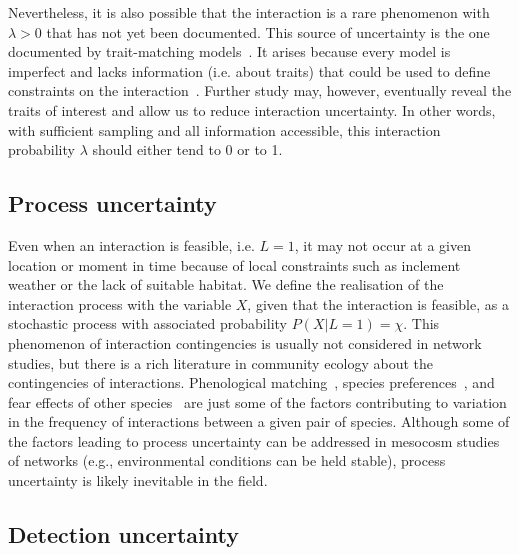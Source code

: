 \documentclass[12pt]{article}
\begin{document}
\begin{spacing}{2.0}
      Nevertheless, it is also possible that the interaction is a rare phenomenon with $\lambda>0$ that has not yet been documented. This source of uncertainty is the one documented by trait-matching models~\citep{Bartomeus2016}. It arises because every model is imperfect and lacks information (i.e. about traits) that could be used to define constraints on the interaction~\citep{Dormann2017}. Further study may, however, eventually reveal the traits of interest and allow us to reduce interaction uncertainty. In other words, with sufficient sampling and all information accessible, this interaction probability $\lambda$ should either tend to 0 or to 1. 

    \subsection*{Process uncertainty} 

     Even when an interaction is feasible, i.e. $L=1$, it may not occur at a given location or moment in time because of local constraints such as inclement weather or the lack of suitable habitat. We define the realisation of the interaction process with the variable $X$, given that the interaction is feasible, as a stochastic process with associated probability $P(X|L=1)=\chi$. This phenomenon of interaction contingencies is usually not considered in network studies, but there is a rich literature in community ecology about the contingencies of interactions. Phenological matching~\citep{MillerRushing2010,Gezon2016}, species preferences~\citep{Pires2011,Novak2015,Coux2016}, and fear effects of other species~\citep{Luttbeg2005,Wirsing2008} are just some of the factors contributing to variation in the frequency of interactions between a given pair of species. Although some of the factors leading to process uncertainty can be addressed in mesocosm studies of networks (e.g., environmental conditions can be held stable), process uncertainty is likely inevitable in the field. 

    \subsection*{Detection uncertainty} 


\end{spacing}
\end{document}
